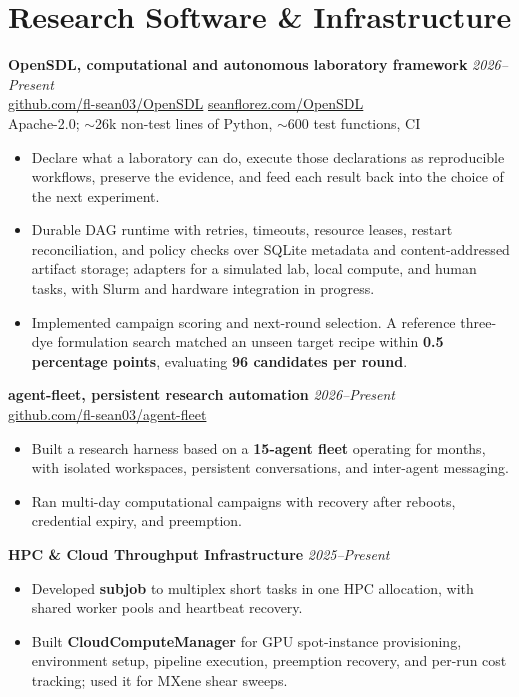 \documentclass[letterpaper,10pt]{article}
\newcommand{\keep}{\needspace{4\baselineskip}}
\newcommand{\keepsection}{\needspace{6\baselineskip}}
\begin{document}
\keepsection\section*{Research Software \& Infrastructure}
\textbf{OpenSDL, computational and autonomous laboratory framework} \hfill \textit{2026--Present}\\
\href{https://github.com/fl-sean03/OpenSDL}{github.com/fl-sean03/OpenSDL} \;\textbar\; \href{https://seanflorez.com/OpenSDL/}{seanflorez.com/OpenSDL}\\
Apache-2.0; \(\sim\)26k non-test lines of Python, \(\sim\)600 test functions, CI
\begin{itemize}
    \item Declare what a laboratory can do, execute those declarations as reproducible workflows, preserve the evidence, and feed each result back into the choice of the next experiment.
    \item Durable DAG runtime with retries, timeouts, resource leases, restart reconciliation, and policy checks over SQLite metadata and content-addressed artifact storage; adapters for a simulated lab, local compute, and human tasks, with Slurm and hardware integration in progress.
    \item Implemented campaign scoring and next-round selection. A reference three-dye formulation search matched an unseen target recipe within \textbf{0.5 percentage points}, evaluating \textbf{96 candidates per round}.
\end{itemize}

\keep\textbf{agent-fleet, persistent research automation} \hfill \textit{2026--Present}\\
\href{https://github.com/fl-sean03/agent-fleet}{github.com/fl-sean03/agent-fleet}
\begin{itemize}
    \item Built a research harness based on a \textbf{15-agent fleet} operating for months, with isolated workspaces, persistent conversations, and inter-agent messaging.
    \item Ran multi-day computational campaigns with recovery after reboots, credential expiry, and preemption.
\end{itemize}

\keep\textbf{HPC \& Cloud Throughput Infrastructure} \hfill \textit{2025--Present}
\begin{itemize}
    \item Developed \textbf{subjob} to multiplex short tasks in one HPC allocation, with shared worker pools and heartbeat recovery.
    \item Built \textbf{CloudComputeManager} for GPU spot-instance provisioning, environment setup, pipeline execution, preemption recovery, and per-run cost tracking; used it for MXene shear sweeps.
\end{itemize}
\end{document}
